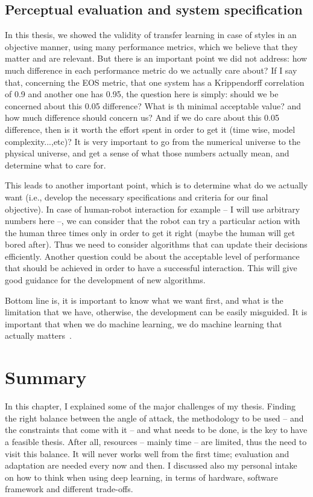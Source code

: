   \subsection{Perceptual evaluation and system specification}
    \par In this thesis, we showed the validity of transfer learning in case of styles in an objective manner, using many performance metrics, which we believe that they matter and are relevant. But there is an important point we did not address: how much difference in each performance metric do we actually care about? If I say that, concerning the EOS metric, that one system has a Krippendorff correlation of 0.9 and another one has 0.95, the question here is simply: should we be concerned about this 0.05 difference? What is th minimal acceptable value? and how much difference should concern us? And if we do care about this 0.05 difference, then is it worth the effort spent in order to get it (time wise, model complexity...,etc)? It is very important to go from the numerical universe to the physical universe, and get a sense of what those numbers actually mean, and determine what to care for.

    \par This leads to another important point, which is to determine what do we actually want (i.e., develop the necessary specifications and criteria for our final objective). In case of human-robot interaction for example -- I will use arbitrary numbers here --, we can consider that the robot can try a particular action with the human three times only in order to get it right (maybe the human will get bored after). Thus we need to consider algorithms that can update their decisions efficiently. Another question could be about the acceptable level of performance that should be achieved in order to have a successful interaction. This will give good guidance for the development of new algorithms.

    \par Bottom line is, it is important to know what we want first, and what is the limitation that we have, otherwise, the development can be easily misguided. It is important that when we do machine learning, we do machine learning that actually matters~\citep{wagstaff2012machine}.

  \section{Summary}
  \par In this chapter, I explained some of the major challenges of my thesis. Finding the right balance between the angle of attack, the methodology to be used -- and the constraints that come with it -- and what needs to be done, is the key to have a feasible thesis. After all, resources -- mainly time -- are limited, thus the need to visit this balance. It will never works well from the first time; evaluation and adaptation are needed every now and then. I discussed also my personal intake on how to think when using deep learning, in terms of hardware, software framework and different trade-offs.

